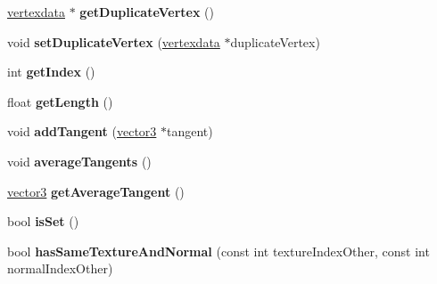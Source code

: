 \begin{DoxyCompactItemize}
\hyperlink{classflounder_1_1vertexdata}{vertexdata} $\ast$ {\bfseries get\+Duplicate\+Vertex} ()
\item 
\mbox{\label{classflounder_1_1vertexdata_a480b179725867cec7672db07d6b7101c}} 
void {\bfseries set\+Duplicate\+Vertex} (\hyperlink{classflounder_1_1vertexdata}{vertexdata} $\ast$duplicate\+Vertex)
\item 
\mbox{\label{classflounder_1_1vertexdata_a0495c9a5a0b393aa8a60acc791f811ea}} 
int {\bfseries get\+Index} ()
\item 
\mbox{\label{classflounder_1_1vertexdata_aedcb3926d616bb3a2cb4acf97961e44c}} 
float {\bfseries get\+Length} ()
\item 
\mbox{\label{classflounder_1_1vertexdata_a30bbe72d9f20899bca357a52b1b61b59}} 
void {\bfseries add\+Tangent} (\hyperlink{classflounder_1_1vector3}{vector3} $\ast$tangent)
\item 
\mbox{\label{classflounder_1_1vertexdata_a93b35e0e8387d6f530354df1bdeca6a5}} 
void {\bfseries average\+Tangents} ()
\item 
\mbox{\label{classflounder_1_1vertexdata_a59fa7932a8788664d3cfc33f04598069}} 
\hyperlink{classflounder_1_1vector3}{vector3} {\bfseries get\+Average\+Tangent} ()
\item 
\mbox{\label{classflounder_1_1vertexdata_ab176408a67cacb2af12d7c5ff9ea06ef}} 
bool {\bfseries is\+Set} ()
\item 
\mbox{\label{classflounder_1_1vertexdata_ab03f3d4ddd418cbfa474bfec3e82522c}} 
bool {\bfseries has\+Same\+Texture\+And\+Normal} (const int texture\+Index\+Other, const int normal\+Index\+Other)
\end{DoxyCompactItemize}
